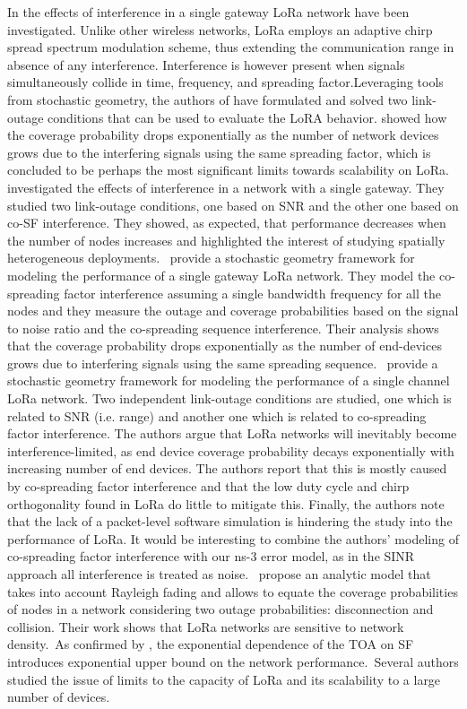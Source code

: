  \cite{georgiou_low_2017}   In \cite{georgiou_low_2017} the effects of interference in a single gateway LoRa network have been investigated. Unlike other wireless networks, LoRa employs an adaptive chirp spread spectrum modulation scheme, thus extending the communication range in absence of any interference. Interference is however present when signals simultaneously collide in time, frequency, and spreading factor.Leveraging tools from stochastic geometry, the authors of \cite{georgiou_low_2017} have formulated and solved two link-outage conditions that can be used to evaluate the LoRA behavior.\citet{georgiou_low_2017} showed how the coverage probability drops exponentially as the number of network devices grows due to the interfering signals using the same spreading factor, which is concluded to be perhaps the most significant limits towards scalability on LoRa.~\citet{georgiou_low_2017} investigated the effects of interference in a network with a single gateway. They studied two link-outage conditions, one based on SNR and the other one based on co-SF interference. They showed, as expected, that performance decreases when the number of nodes increases and highlighted the interest of studying spatially heterogeneous deployments.~\citet{georgiou_low_2017} provide a stochastic geometry framework for modeling the performance of a single gateway LoRa network. They model the co-spreading factor interference assuming a single bandwidth frequency for all the nodes and they measure the outage and coverage probabilities based on the signal to noise ratio and the co-spreading sequence interference. Their analysis shows that the coverage probability drops exponentially as the number of end-devices grows due to interfering signals using the same spreading sequence.~\citet{georgiou_low_2017} provide a stochastic geometry framework for modeling the performance of a single channel LoRa network. Two independent link-outage conditions are studied, one which is related to SNR (i.e. range) and another one which is related to co-spreading factor interference. The authors argue that LoRa networks will inevitably become interference-limited, as end device coverage probability decays exponentially with increasing number of end devices. The authors report that this is mostly caused by co-spreading factor interference and that the low duty cycle and chirp orthogonality found in LoRa do little to mitigate this. Finally, the authors note that the lack of a packet-level software simulation is hindering the study into the performance of LoRa. It would be interesting to combine the authors' modeling of co-spreading factor interference with our ns-3 error model, as in the SINR approach all interference is treated as noise.~\citet{georgiou_low_2017} propose an analytic model that takes into account Rayleigh fading and allows to equate the coverage probabilities of nodes in a network considering two outage probabilities: disconnection and collision. Their work shows that LoRa networks are sensitive to network density.~As confirmed by \citet{georgiou_low_2017}, the exponential dependence of the TOA on SF introduces exponential upper bound on the network performance.~Several authors studied the issue of limits to the capacity of LoRa and its scalability to a large number of devices. 